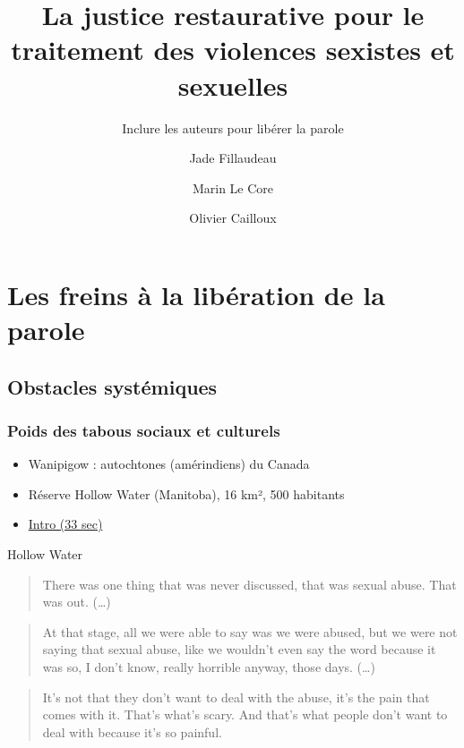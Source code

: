 \documentclass[french]{beamer}
\title[La justice restaurative pour le traitement des VSS]{La justice restaurative pour le traitement des violences sexistes et sexuelles}
\subtitle{Inclure les auteurs pour libérer la parole}
\author[Jade \and Marin \and Olivier]{Jade Fillaudeau \and Marin Le Core \and Olivier Cailloux}
\institute[Paris-Dauphine]{Université Paris-Dauphine}
\date{\formatdate{31}{1}{2025}}
\begin{document}
\begin{frame}[plain]
  \titlepage
\end{frame}
\addtocounter{framenumber}{-1}

\begin{frame}
  \frametitle{}
  \tableofcontents[hideallsubsections]
\end{frame}


\section{Les freins à la libération de la parole}
\subsection{Obstacles systémiques}
\begin{frame}
  \frametitle{Poids des tabous sociaux et culturels}
  \begin{itemize}
    \item Wanipigow : autochtones (amérindiens) du Canada
    \item Réserve Hollow Water (Manitoba), 16 km², 500 habitants
    \item \href{https://www.nfb.ca/film/hollow_water/}{Intro (33 sec)}
  \end{itemize}
  \begin{block}{Hollow Water}
    \begin{quote}
      There was one thing that was never discussed, that was sexual abuse.
      That was out. 
      (…)
    \end{quote}
    \begin{quote}
      At that stage, all we were able to say was we were abused, but we were not saying that sexual abuse, like we wouldn’t even say the word because it was so, I don’t know, really horrible anyway, those days.
      (…)
    \end{quote}
    \begin{quote}
It’s not that they don’t want to deal with the abuse,
it’s the pain that comes with it.
That’s what’s scary.
And that’s what people don’t want to deal with
because it’s so painful.
    \end{quote}
  \end{block}
\end{frame}
\end{document}
